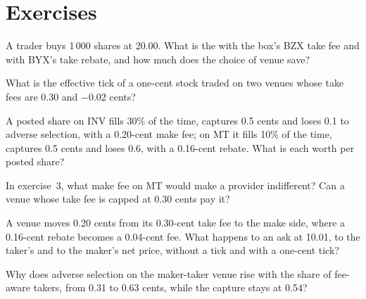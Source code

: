 \section{Exercises}

\begin{exercise}[$\star$]\label{exo:mx:fees-rebates-and-venue-economics:1}
A trader buys 1\,000 shares at 20.00. What is the  with the box's BZX take fee and with BYX's take rebate, and how much does the choice
of venue save?
\end{exercise}

\begin{exercise}[$\star$]\label{exo:mx:fees-rebates-and-venue-economics:2}
What is the effective tick of a one-cent stock traded on two venues whose take fees are 0.30 and $-0.02$ cents?
\end{exercise}

\begin{exercise}[$\star$]\label{exo:mx:fees-rebates-and-venue-economics:3}
A posted share on INV fills 30\% of the time, captures 0.5 cents and loses 0.1 to adverse selection, with a 0.20-cent make fee; on MT it fills 10\% of the
time, captures 0.5 cents and loses 0.6, with a 0.16-cent rebate. What is each worth per posted share?
\end{exercise}

\begin{exercise}[$\star\star$]\label{exo:mx:fees-rebates-and-venue-economics:4}
In exercise~3, what make fee on MT would make a provider indifferent? Can a venue whose take fee is capped at 0.30 cents pay it?
\end{exercise}

\begin{exercise}[$\star\star$]\label{exo:mx:fees-rebates-and-venue-economics:5}
A venue moves 0.20 cents from its 0.30-cent take fee to the make side, where a 0.16-cent rebate becomes a 0.04-cent fee. What happens to an ask at 10.01,
to the taker's  and to the maker's net price, without a tick and with a one-cent tick?
\end{exercise}

\begin{exercise}[$\star\star$]\label{exo:mx:fees-rebates-and-venue-economics:6}
Why does adverse selection on the maker-taker venue rise with the share of fee-aware takers, from 0.31 to 0.63 cents, while the capture stays at 0.54?
\end{exercise}

